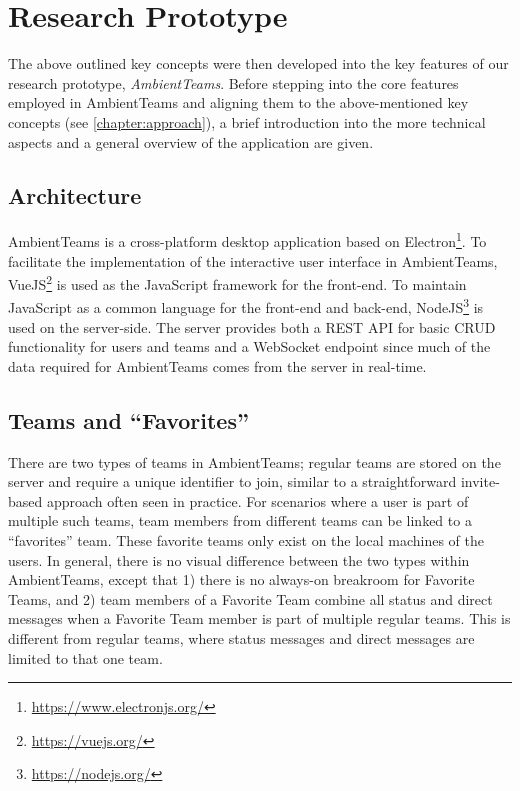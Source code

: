 \chapter{Research Prototype}
\label{chapter:prototype}
The above outlined key concepts were then developed into the key features of our research prototype, \textit{AmbientTeams}. Before stepping into the core features employed in AmbientTeams and aligning them to the above-mentioned key concepts (see \autoref{chapter:approach}), a brief introduction into the more technical aspects and a general overview of the application are given.

\section{Architecture}
AmbientTeams is a cross-platform desktop application based on Electron\footnote{\url{https://www.electronjs.org/}}. To facilitate the implementation of the interactive user interface in AmbientTeams, VueJS\footnote{\url{https://vuejs.org/}} is used as the JavaScript framework for the front-end. To maintain JavaScript as a common language for the front-end and back-end, NodeJS\footnote{\url{https://nodejs.org/}} is used on the server-side. The server provides both a REST API for basic CRUD functionality for users and teams and a WebSocket endpoint since much of the data required for AmbientTeams comes from the server in real-time.

\section{Teams and \enquote{Favorites}}
There are two types of teams in AmbientTeams; regular teams are stored on the server and require a unique identifier to join, similar to a straightforward invite-based approach often seen in practice. For scenarios where a user is part of multiple such teams, team members from different teams can be linked to a \enquote{favorites} team. These favorite teams only exist on the local machines of the users. In general, there is no visual difference between the two types within AmbientTeams, except that 1) there is no always-on breakroom for Favorite Teams, and 2) team members of a Favorite Team combine all status and direct messages when a Favorite Team member is part of multiple regular teams. This is different from regular teams, where status messages and direct messages are limited to that one team.

